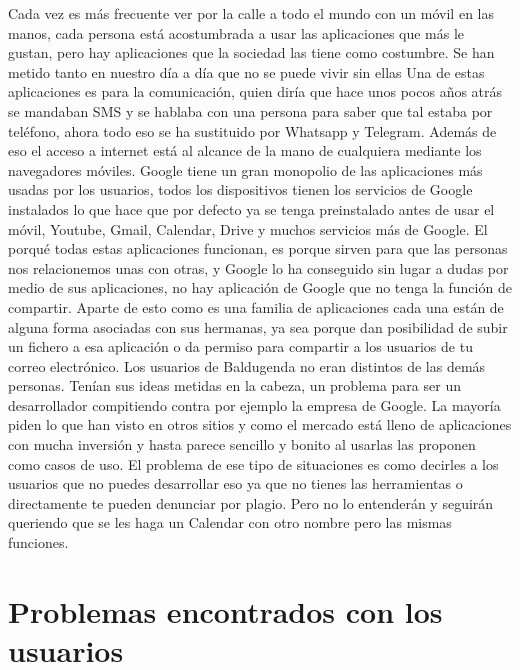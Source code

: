 Cada vez es más frecuente ver por la calle a todo el mundo con un móvil en las manos, cada persona está acostumbrada a usar las aplicaciones que más le gustan, pero hay aplicaciones que la sociedad las tiene como costumbre. Se han metido tanto en nuestro día a día que no se puede vivir sin ellas
Una de estas aplicaciones es para la comunicación, quien diría que hace unos pocos años atrás se mandaban SMS y se hablaba con una persona para saber que tal estaba por teléfono, ahora todo eso se ha sustituido por Whatsapp y Telegram.
Además de eso el acceso a internet está al alcance de la mano de cualquiera mediante los navegadores móviles.
Google tiene un gran monopolio de las aplicaciones más usadas por los usuarios, todos los dispositivos tienen los servicios de Google instalados lo que hace que por defecto ya se tenga preinstalado antes de usar el móvil, Youtube, Gmail, Calendar, Drive y muchos servicios más de Google.
El porqué  todas estas aplicaciones funcionan, es porque sirven para que las personas nos relacionemos unas con otras, y Google lo ha conseguido sin lugar a dudas por medio de sus aplicaciones, no hay aplicación de Google que no tenga la función de compartir.
Aparte de esto como es una familia de aplicaciones cada una están de alguna forma asociadas con sus hermanas, ya sea porque dan posibilidad de subir un fichero a esa aplicación o da permiso para compartir a los usuarios de tu correo electrónico.
Los usuarios de Baldugenda no eran distintos de las demás personas.
Tenían sus ideas metidas en la cabeza, un problema para ser un desarrollador compitiendo contra por ejemplo la empresa de Google.
La mayoría piden lo que han visto en otros sitios y como el mercado está lleno de aplicaciones con mucha inversión y hasta parece sencillo y bonito al usarlas las proponen como casos de uso. 
El problema de ese tipo de situaciones es como decirles a los usuarios que no puedes desarrollar eso ya que no tienes las herramientas o directamente te pueden denunciar por plagio.
Pero no lo entenderán y seguirán queriendo que se les haga un Calendar con otro nombre pero las mismas funciones.

\section{Problemas encontrados con los usuarios}
\label{secc:problemas encontrados con los usuarios}

